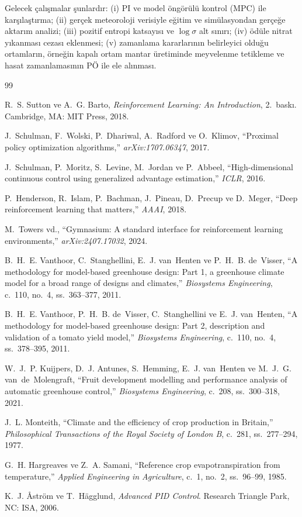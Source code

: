 \documentclass[conference,a4paper]{IEEEtran}
\begin{document}
Gelecek çalışmalar şunlardır: (i) PI ve model öngörülü kontrol (MPC) ile karşılaştırma; (ii) gerçek meteoroloji verisiyle eğitim ve simülasyondan gerçeğe aktarım analizi; (iii) pozitif entropi katsayısı ve $\log\sigma$ alt sınırı; (iv) ödüle nitrat yıkanması cezası eklenmesi; (v) zamanlama kararlarının belirleyici olduğu ortamların, örneğin kapalı ortam mantar üretiminde meyvelenme tetikleme ve hasat zamanlamasının PÖ ile ele alınması.

\begin{thebibliography}{99}

R.~S. Sutton ve A.~G. Barto, \emph{Reinforcement Learning: An Introduction}, 2.~baskı. Cambridge, MA: MIT Press, 2018.

J.~Schulman, F.~Wolski, P.~Dhariwal, A.~Radford ve O.~Klimov, ``Proximal policy optimization algorithms,'' \emph{arXiv:1707.06347}, 2017.

J.~Schulman, P.~Moritz, S.~Levine, M.~Jordan ve P.~Abbeel, ``High-dimensional continuous control using generalized advantage estimation,'' \emph{ICLR}, 2016.

P.~Henderson, R.~Islam, P.~Bachman, J.~Pineau, D.~Precup ve D.~Meger, ``Deep reinforcement learning that matters,'' \emph{AAAI}, 2018.

M.~Towers vd., ``Gymnasium: A standard interface for reinforcement learning environments,'' \emph{arXiv:2407.17032}, 2024.

B.~H.~E. Vanthoor, C.~Stanghellini, E.~J. van~Henten ve P.~H.~B. de~Visser, ``A methodology for model-based greenhouse design: Part 1, a greenhouse climate model for a broad range of designs and climates,'' \emph{Biosystems Engineering}, c.~110, no.~4, ss.~363--377, 2011.

B.~H.~E. Vanthoor, P.~H.~B. de~Visser, C.~Stanghellini ve E.~J. van~Henten, ``A methodology for model-based greenhouse design: Part 2, description and validation of a tomato yield model,'' \emph{Biosystems Engineering}, c.~110, no.~4, ss.~378--395, 2011.

W.~J.~P. Kuijpers, D.~J. Antunes, S.~Hemming, E.~J. van~Henten ve M.~J.~G. van~de~Molengraft, ``Fruit development modelling and performance analysis of automatic greenhouse control,'' \emph{Biosystems Engineering}, c.~208, ss.~300--318, 2021.

J.~L. Monteith, ``Climate and the efficiency of crop production in Britain,'' \emph{Philosophical Transactions of the Royal Society of London B}, c.~281, ss.~277--294, 1977.

G.~H. Hargreaves ve Z.~A. Samani, ``Reference crop evapotranspiration from temperature,'' \emph{Applied Engineering in Agriculture}, c.~1, no.~2, ss.~96--99, 1985.

K.~J. Åström ve T.~Hägglund, \emph{Advanced PID Control}. Research Triangle Park, NC: ISA, 2006.

\end{thebibliography}
\end{document}
